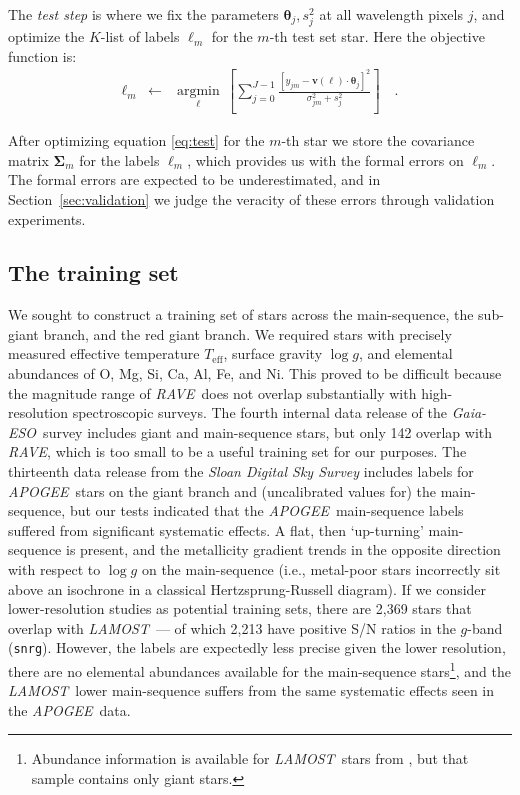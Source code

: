 \documentclass[preprint]{aastex}
\newcommand{\acronym}[1]{{\small{#1}}}
\newcommand{\project}[1]{\textsl{#1}}
\newcommand{\rave}{\project{\acronym{RAVE}}}
\newcommand{\ges}{\project{Gaia-ESO}}
\newcommand{\apogee}{\project{\acronym{APOGEE}}}
\newcommand{\lamost}{\project{\acronym{LAMOST}}}
\newcommand{\teff}{T_{\mathrm{eff}}}
\newcommand{\logg}{\log g}
\newcommand{\Dvector}[1]{\boldsymbol{#1}}
\newcommand{\vectheta}{\Dvector{\theta}}
\newcommand{\vecv}{\Dvector{v}}
\newcommand{\argmin}[1]{\underset{#1}{\operatorname{argmin}}\,}
\begin{document}
The \emph{test step} is where we fix the parameters $\vectheta_j,s_j^2$ at all wavelength
pixels $j$, and optimize the $K$-list of labels $\ell_m$ for the $m$-th test set star.  Here
the objective function is:
\begin{eqnarray}\label{eq:test}
  \ell_m &\leftarrow& \argmin{\ell}\left[
    \sum_{j=0}^{J-1} \frac{[y_{jm}-\vecv(\ell)\cdot\vectheta_j]^2}{\sigma_{jm}^2 + s_j^2}
    \right]
  \quad .
\end{eqnarray}

After optimizing equation \ref{eq:test} for the $m$-th star we store the covariance matrix 
$\bm{\Sigma}_m$ for the labels $\ell_m$, which provides us with the formal errors on $\ell_m$. 
The formal errors are expected to be underestimated, and in Section~\ref{sec:validation} 
we judge the veracity of these errors through validation experiments.



\subsection{The training set}
\label{sec:the-training-set}


We sought to construct a training set of stars across the main-sequence, the
sub-giant branch, and the red giant branch.  We required stars with precisely measured
effective temperature $\teff$, surface gravity $\logg$, and elemental abundances
of O, Mg, Si, Ca, Al, Fe, and Ni.  This proved to be difficult because the magnitude
range of \rave\ does not overlap substantially with high-resolution spectroscopic
surveys.  The fourth internal data release of the \ges\ survey includes 
giant and main-sequence stars, but only 142 overlap with \rave, which is too small to
be a useful training set for our purposes.  The thirteenth data release from the 
\project{Sloan Digital Sky Survey} \citep{sloan_dr13} includes labels for \apogee\ stars on the
giant branch and (uncalibrated values for) the main-sequence, but our tests indicated
that the \apogee\ main-sequence labels suffered from significant systematic effects.  
A flat, then `up-turning' main-sequence is present, and the metallicity gradient trends in 
the opposite direction with respect to $\logg$ on the main-sequence (i.e., metal-poor
stars incorrectly sit above an isochrone in a classical Hertzsprung-Russell diagram).
If we consider lower-resolution studies as potential training sets, there are 2,369
stars that overlap with \lamost\ --- of which 2,213 have positive S/N ratios in the 
$g$-band (\texttt{snrg}).  However, the labels are expectedly less precise given the
lower resolution, there are no elemental abundances available for the main-sequence 
stars\footnote{Abundance information is available for \lamost\ stars from \citet{Ho_2016},
but that sample contains only giant stars.}, and the \lamost\ lower main-sequence suffers
from the same systematic effects seen in the \apogee\ data. 
\end{document}
